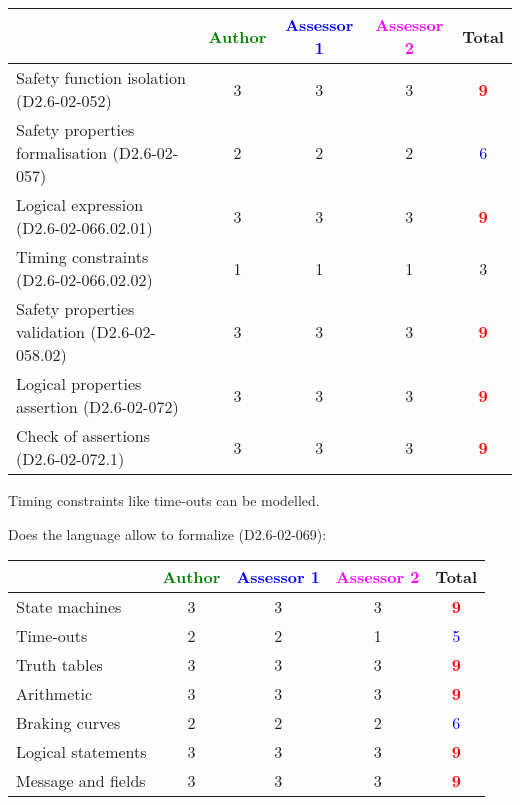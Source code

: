\begin{tabular}{|l | c | c | c | c|}
\hline
& \textcolor{green}{Author} & \textcolor{blue}{Assessor 1} & \textcolor{magenta}{Assessor 2} & Total \\
\hline 
Safety function isolation (D2.6-02-052)  & 3    & 3    & 3    & \textcolor{red}{\textbf{9}} \\
\hline 
Safety properties formalisation (D2.6-02-057)  & 2    & 2    & 2    & \textcolor{blue}{6} \\
\hline
Logical expression (D2.6-02-066.02.01)  & 3    & 3    & 3    & \textcolor{red}{\textbf{9}} \\
\hline
Timing constraints (D2.6-02-066.02.02)  & 1    & 1    & 1    & 3    \\
\hline
Safety properties validation (D2.6-02-058.02)  & 3    & 3    & 3    & \textcolor{red}{\textbf{9}} \\
\hline
Logical properties assertion (D2.6-02-072)  &  3 & 3    & 3    & \textcolor{red}{\textbf{9}} \\
\hline
Check  of assertions (D2.6-02-072.1)  & 3    & 3    & 3    & \textcolor{red}{\textbf{9}} \\
\hline
\end{tabular}


\begin{author_comment}
Timing constraints like time-outs can be modelled.
\end{author_comment}


Does the language allow to  formalize (D2.6-02-069):

\begin{tabular}{|l | c | c | c | c|}
\hline
& \textcolor{green}{Author} & \textcolor{blue}{Assessor 1} & \textcolor{magenta}{Assessor 2} & Total \\
\hline 
State machines  & 3    & 3    & 3    & \textcolor{red}{\textbf{9}} \\
\hline
Time-outs  & 2    & 2    & 1    & \textcolor{blue}{5}  \\
\hline
Truth tables  & 3    & 3    & 3    & \textcolor{red}{\textbf{9}} \\
\hline
Arithmetic  & 3    & 3    & 3    & \textcolor{red}{\textbf{9}} \\
\hline
Braking curves  & 2    & 2    & 2    & \textcolor{blue}{6} \\
\hline
Logical statements & 3    & 3    & 3    & \textcolor{red}{\textbf{9}} \\
\hline
Message and fields & 3    & 3    & 3    & \textcolor{red}{\textbf{9}} \\
\hline
\end{tabular}


